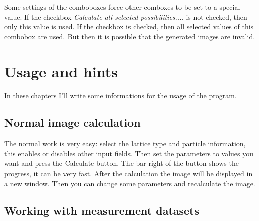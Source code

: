 \documentclass[11pt]{article} %
\begin{document}
Some settings of the comboboxes force other comboxes to be set to a special value. If the checkbox {\it Calculate all selected possibilities....} is not checked, then only this value is used. If the checkbox is checked, then all selected values of this combobox are used. But then it is possible that the generated images are invalid.


\clearpage
\section{Usage and hints}

In these chapters I'll write some informations for the usage of the program.

\subsection{Normal image calculation}

The normal work is very easy: select the lattice type and particle information, this enables or disables other input fields. Then set the parameters to values you want and press the Calculate button. The bar right of the button shows the progress, it can be very fast. After the calculation the image will be displayed in a new window. Then you can change some parameters and recalculate the image.

\subsection{Working with measurement datasets}
\end{document}
